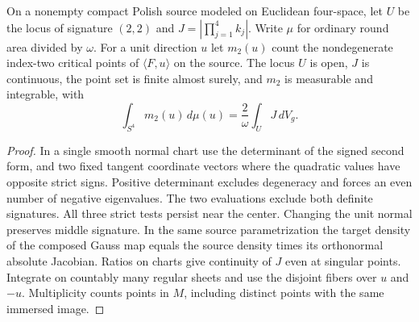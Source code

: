 \begin{theorem}
\label{thm:ed03-ordinary-indexed-area}
\leanok
On a nonempty compact Polish source modeled on Euclidean four-space, let $U$
be the locus of signature $(2,2)$ and $J=|\prod_{j=1}^4 k_j|$. Write
$\mu$ for ordinary round area divided by $\omega$. For a unit direction $u$
let $m_2(u)$ count the nondegenerate index-two critical points of
$\langle F,u\rangle$ on the source. The locus $U$ is open, $J$ is
continuous, the point set is finite almost surely, and $m_2$ is measurable
and integrable, with
\[
    \int_{S^4}m_2(u)\,d\mu(u)=\frac{2}{\omega}\int_U J\,dV_g .
\]
\end{theorem}
\begin{proof}
\leanok
In a single smooth normal chart use the determinant of the signed second
form, and two fixed tangent coordinate vectors where the quadratic values
have opposite strict signs. Positive determinant excludes degeneracy and
forces an even number of negative eigenvalues. The two evaluations exclude
both definite signatures. All three strict tests persist near the center.
Changing the unit normal preserves middle signature. In the same source
parametrization the target density of the composed Gauss map equals the
source density times its orthonormal absolute Jacobian. Ratios on charts
give continuity of $J$ even at singular points. Integrate on countably many
regular sheets and use the disjoint fibers over $u$ and $-u$. Multiplicity
counts points in $M$, including distinct points with the same immersed image.
\end{proof}

